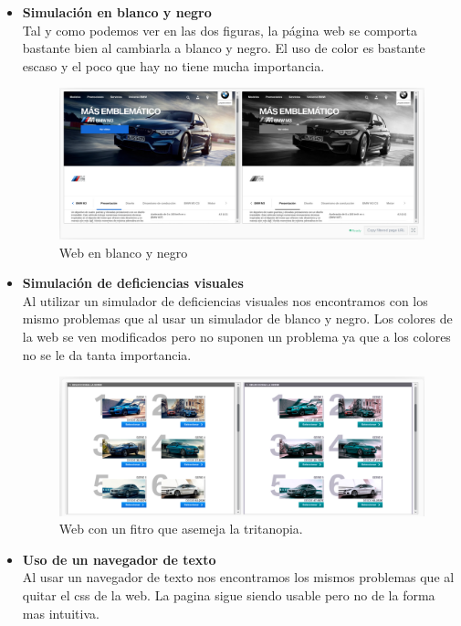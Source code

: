\documentclass[a4paper,11pt]{article}
\begin{document}
\begin{itemize}
  \item \textbf{Simulación en blanco y negro}\\
  Tal y como podemos ver en las dos figuras, la página web se comporta bastante bien al cambiarla a blanco y negro. El uso de color es bastante escaso y el poco que hay no tiene mucha importancia.
  \begin{figure}[H]
    \centering
    \includegraphics[scale=0.4]{byn1.png}
    \caption{Web en blanco y negro}
    \label{fig:byn1}
  \end{figure}


  \item \textbf{Simulación de deficiencias visuales}\\
  Al utilizar un simulador de deficiencias visuales nos encontramos con los mismo problemas que al usar un simulador de blanco y negro. Los colores de la web se ven modificados pero no suponen un problema ya que a los colores no se le da tanta importancia.
  \begin{figure}[H]
    \centering
    \includegraphics[scale=0.35]{tritanopia.png}
    \caption{Web con un fitro que asemeja la tritanopia.}
    \label{fig:trit}

  \end{figure}
  \item \textbf{Uso de un navegador de texto}\\

Al usar un navegador de texto nos encontramos los mismos problemas que al quitar el css de la web. La pagina sigue siendo usable pero no de la forma mas intuitiva.


\end{itemize}
\end{document}
